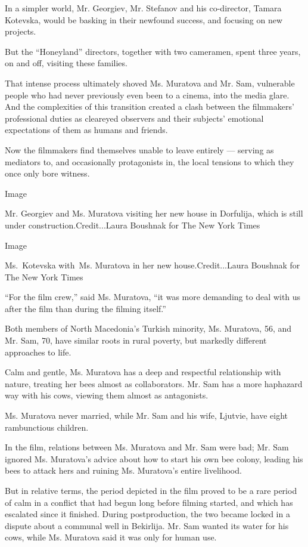 In a simpler world, Mr. Georgiev, Mr. Stefanov and his co-director,
Tamara Kotevska, would be basking in their newfound success, and
focusing on new projects.

But the ``Honeyland'' directors, together with two cameramen, spent
three years, on and off, visiting these families.

That intense process ultimately shoved Ms. Muratova and Mr. Sam,
vulnerable people who had never previously even been to a cinema, into
the media glare. And the complexities of this transition created a clash
between the filmmakers' professional duties as cleareyed observers and
their subjects' emotional expectations of them as humans and friends.

Now the filmmakers find themselves unable to leave entirely --- serving
as mediators to, and occasionally protagonists in, the local tensions to
which they once only bore witness.

Image

Mr. Georgiev and Ms. Muratova visiting her new house in Dorfulija, which
is still under construction.Credit...Laura Boushnak for The New York
Times

Image

Ms.~Kotevska with~Ms. Muratova in her new house.Credit...Laura Boushnak
for The New York Times

``For the film crew,'' said Ms. Muratova, ``it was more demanding to
deal with us after the film than during the filming itself.''

Both members of North Macedonia's Turkish minority, Ms. Muratova, 56,
and Mr. Sam, 70, have similar roots in rural poverty, but markedly
different approaches to life.

Calm and gentle, Ms. Muratova has a deep and respectful relationship
with nature, treating her bees almost as collaborators. Mr. Sam has a
more haphazard way with his cows, viewing them almost as antagonists.

Ms. Muratova never married, while Mr. Sam and his wife, Ljutvie, have
eight rambunctious children.

In the film, relations between Ms. Muratova and Mr. Sam were bad; Mr.
Sam ignored Ms. Muratova's advice about how to start his own bee colony,
leading his bees to attack hers and ruining Ms. Muratova's entire
livelihood.

But in relative terms, the period depicted in the film proved to be a
rare period of calm in a conflict that had begun long before filming
started, and which has escalated since it finished. During
postproduction, the two became locked in a dispute about a communal well
in Bekirlija. Mr. Sam wanted its water for his cows, while Ms. Muratova
said it was only for human use.

